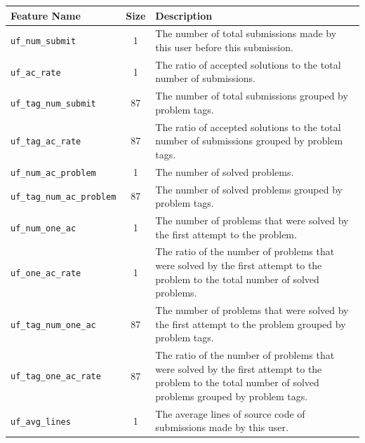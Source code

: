         \begin{table}[hpbt]
        \centering
        \begin{tabular}{lcp{10cm}}
            \hline
            Feature Name & Size & Description \\
            \hline
            {\footnotesize\verb|uf_num_submit|} & 1 &
                The number of total submissions made by this user before this submission. \\
            {\footnotesize\verb|uf_ac_rate|} & 1 &
                The ratio of accepted solutions to the total number of submissions. \\
            {\footnotesize\verb|uf_tag_num_submit|} & 87 &
                The number of total submissions grouped by problem tags. \\
            {\footnotesize\verb|uf_tag_ac_rate|} & 87 &
                The ratio of accepted solutions to the total number of submissions grouped by problem tags. \\
            \hline
            {\footnotesize\verb|uf_num_ac_problem|} & 1 &
                The number of solved problems. \\
            {\footnotesize\verb|uf_tag_num_ac_problem|} & 87 &
                The number of solved problems grouped by problem tags. \\
            {\footnotesize\verb|uf_num_one_ac|} & 1 &
                The number of problems that were solved by the first attempt to the problem. \\
            {\footnotesize\verb|uf_one_ac_rate|} & 1 &
                The ratio of the number of problems that were solved by the first attempt to the problem
                to the total number of solved problems. \\
            {\footnotesize\verb|uf_tag_num_one_ac|} & 87 &
                The number of problems that were solved by the first attempt to the problem grouped by problem tags. \\
            {\footnotesize\verb|uf_tag_one_ac_rate|} & 87 &
                The ratio of the number of problems that were solved by the first attempt to the problem
                to the total number of solved problems grouped by problem tags. \\
            {\footnotesize\verb|uf_avg_lines|} & 1 &
                The average lines of source code of submissions made by this user. \\

\end{tabular}
\end{table}
